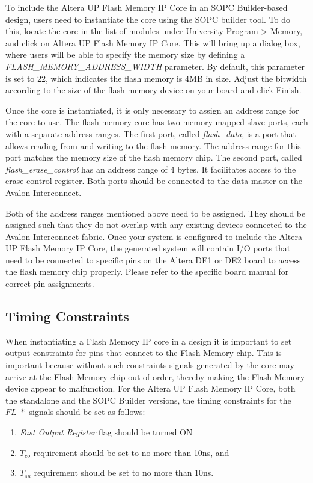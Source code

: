 To include the Altera UP Flash Memory IP Core in an SOPC Builder-based design, users need to instantiate
the core using the SOPC builder tool. To do this, locate the core in the list of modules under {\sf University Program > Memory}, and click on {\sf Altera UP Flash Memory IP Core}. This will bring up a dialog box, where users will be able to specify the memory size by defining a {\it FLASH\_MEMORY\_ADDRESS\_WIDTH} parameter. By default, this parameter is set to 22, which indicates the flash memory is 4MB in size. Adjust the bitwidth according to the size of the flash memory device on your board and click Finish.

Once the core is instantiated, it is only necessary to assign an address range for
the core to use. The flash memory core has two memory mapped slave ports, each with a separate address ranges.
The first port, called {\it flash\_data}, is a port that allows reading from and writing to the flash memory.
The address range for this port matches the memory size of the flash memory chip. The second port, called {\it flash\_erase\_control}
has an address range of 4 bytes. It facilitates access to the erase-control register. Both ports should be connected to
the data master on the Avalon Interconnect.

Both of the address ranges mentioned above need to be assigned. They should be assigned such that they do not overlap with
any existing devices connected to the Avalon Interconnect fabric. Once your system is configured to include the Altera UP Flash
Memory IP Core, the generated system will contain I/O ports that need to be connected to specific pins
on the Altera DE1 or DE2 board to access the flash memory chip properly. Please refer to the specific board manual for
correct pin assignments.

\subsection{Timing Constraints}

When instantiating a Flash Memory IP core in a design it is important to set output constraints for pins that connect to the
Flash Memory chip. This is important because without such constraints signals generated by the core may arrive at the Flash
Memory chip out-of-order, thereby making the Flash Memory device appear to malfunction. For the Altera UP Flash Memory IP Core,
both the standalone and the SOPC Builder versions, the timing constraints for the $FL\_*$ signals should be set as follows:
\begin{enumerate}
\item {\it Fast Output Register} flag should be turned ON
\item $T_{co}$ requirement should be set to no more than 10ns, and
\item $T_{su}$ requirement should be set to no more than 10ns.
\end{enumerate}


